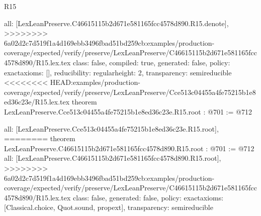 \begin{lexlean}{R15}
\begin{coremodule}
{{{{{  all: [LexLeanPreserve.C46615115b2d671e581165fcc4578d890.R15.denote],
>>>>>>>> 6a02d2c7d519f1a4d169ebb3496fbad51bd259cb:examples/production-coverage/expected/verify/preserve/LexLeanPreserve/C46615115b2d671e581165fcc4578d890/R15.lex.tex
  class: false,
  compiled: true,
  generated: false,
  policy: exact{axioms: []},
  reducibility: regular{height: 2},
  transparency: semireducible
}
<<<<<<<< HEAD:examples/production-coverage/expected/verify/preserve/LexLeanPreserve/Cce513c04455a4fe75215b1e8ed36c23e/R15.lex.tex
theorem LexLeanPreserve.Cce513c04455a4fe75215b1e8ed36c23e.R15.root : @701 := @712 {
  all: [LexLeanPreserve.Cce513c04455a4fe75215b1e8ed36c23e.R15.root],
========
theorem LexLeanPreserve.C46615115b2d671e581165fcc4578d890.R15.root : @701 := @712 {
  all: [LexLeanPreserve.C46615115b2d671e581165fcc4578d890.R15.root],
>>>>>>>> 6a02d2c7d519f1a4d169ebb3496fbad51bd259cb:examples/production-coverage/expected/verify/preserve/LexLeanPreserve/C46615115b2d671e581165fcc4578d890/R15.lex.tex
  class: false,
  generated: false,
  policy: exact{axioms: [Classical.choice, Quot.sound, propext]},
  transparency: semireducible
}

}}}}}
\end{coremodule}
\end{lexlean}
